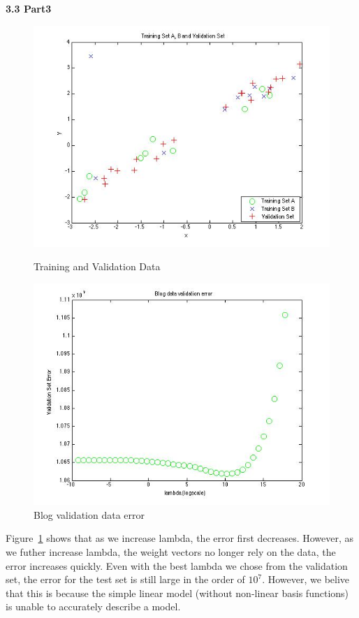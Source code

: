 {\bfseries 3.3 Part3}
\begin{figure}[!htb]
  \includegraphics[width=\linewidth]{figures/p3_training_validation_data}
  \caption{Training and Validation Data}\label{fig:p3_training_validation_data}
  \endminipage\hfill
  \includegraphics[width=\linewidth]{figures/p3_blogdata_lambda}
  \caption{Blog validation data error}\label{fig:p3_blog_data}
  \endminipage\hfill
\end{figure}

Figure~\ref{fig:p3_blog_data} shows that as we increase lambda, the error first decreases. However, as we futher increase lambda, the weight vectors no longer rely on the data, the error increases quickly. Even with the best lambda we chose from the validation set, the error for the test set is still large
in the order of $10^{7}$. However, we belive that this is because the simple linear model (without non-linear basis functions) is unable to accurately describe a model. 
